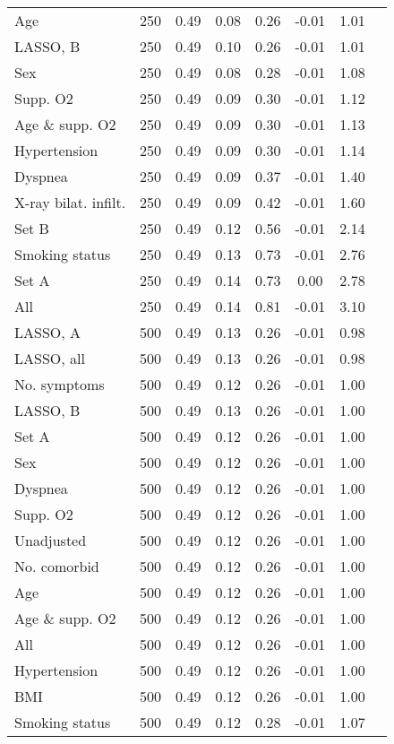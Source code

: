 \documentclass{article}
\begin{document}
{\begin{longtable}{lccccccc}
Age & 250 & 0.49 & 0.08 & 0.26 & -0.01 & 1.01\\
LASSO, B & 250 & 0.49 & 0.10 & 0.26 & -0.01 & 1.01\\
Sex & 250 & 0.49 & 0.08 & 0.28 & -0.01 & 1.08\\
Supp. O2 & 250 & 0.49 & 0.09 & 0.30 & -0.01 & 1.12\\
Age \& supp. O2 & 250 & 0.49 & 0.09 & 0.30 & -0.01 & 1.13\\
Hypertension & 250 & 0.49 & 0.09 & 0.30 & -0.01 & 1.14\\
Dyspnea & 250 & 0.49 & 0.09 & 0.37 & -0.01 & 1.40\\
X-ray bilat. infilt. & 250 & 0.49 & 0.09 & 0.42 & -0.01 & 1.60\\
Set B & 250 & 0.49 & 0.12 & 0.56 & -0.01 & 2.14\\
Smoking status & 250 & 0.49 & 0.13 & 0.73 & -0.01 & 2.76\\
Set A & 250 & 0.49 & 0.14 & 0.73 & 0.00 & 2.78\\
All & 250 & 0.49 & 0.14 & 0.81 & -0.01 & 3.10\\ \midrule
LASSO, A & 500 & 0.49 & 0.13 & 0.26 & -0.01 & 0.98\\
LASSO, all & 500 & 0.49 & 0.13 & 0.26 & -0.01 & 0.98\\
No. symptoms & 500 & 0.49 & 0.12 & 0.26 & -0.01 & 1.00\\
LASSO, B & 500 & 0.49 & 0.13 & 0.26 & -0.01 & 1.00\\
Set A & 500 & 0.49 & 0.12 & 0.26 & -0.01 & 1.00\\
Sex & 500 & 0.49 & 0.12 & 0.26 & -0.01 & 1.00\\
Dyspnea & 500 & 0.49 & 0.12 & 0.26 & -0.01 & 1.00\\
Supp. O2 & 500 & 0.49 & 0.12 & 0.26 & -0.01 & 1.00\\
Unadjusted & 500 & 0.49 & 0.12 & 0.26 & -0.01 & 1.00\\
No. comorbid & 500 & 0.49 & 0.12 & 0.26 & -0.01 & 1.00\\
Age & 500 & 0.49 & 0.12 & 0.26 & -0.01 & 1.00\\
Age \& supp. O2 & 500 & 0.49 & 0.12 & 0.26 & -0.01 & 1.00\\
All & 500 & 0.49 & 0.12 & 0.26 & -0.01 & 1.00\\
Hypertension & 500 & 0.49 & 0.12 & 0.26 & -0.01 & 1.00\\
BMI & 500 & 0.49 & 0.12 & 0.26 & -0.01 & 1.00\\
Smoking status & 500 & 0.49 & 0.12 & 0.28 & -0.01 & 1.07\\

\end{longtable}}
\end{document}

